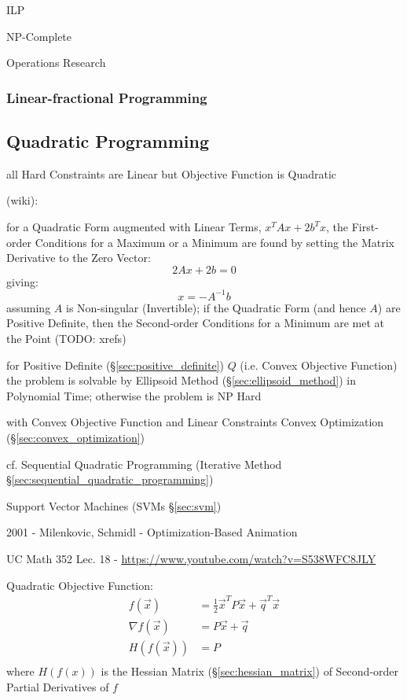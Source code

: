 ILP

NP-Complete

Operations Research



\subsubsection{Linear-fractional Programming}
\label{sec:linear_fractional_programming}



\subsection{Quadratic Programming}\label{sec:quadratic_programming}

all Hard Constraints are Linear but Objective Function is Quadratic

(wiki):

for a Quadratic Form augmented with Linear Terms, $x^TAx + 2b^Tx$, the
First-order Conditions for a Maximum or a Minimum are found by setting the
Matrix Derivative to the Zero Vector:
\[
  2Ax + 2b = 0
\]
giving:
\[
  x = -A^{-1}b
\]
assuming $A$ is Non-singular (Invertible); if the Quadratic Form (and hence
$A$) are Positive Definite, then the Second-order Conditions for a
Minimum are met at the Point
(TODO: xrefs)

for Positive Definite (\S\ref{sec:positive_definite}) $Q$ (i.e. Convex
Objective Function) the problem is solvable by Ellipsoid Method
(\S\ref{sec:ellipsoid_method}) in Polynomial Time; otherwise the problem is NP
Hard

with Convex Objective Function and Linear Constraints \fist Convex Optimization
(\S\ref{sec:convex_optimization})

\fist cf. Sequential Quadratic Programming (Iterative Method
\S\ref{sec:sequential_quadratic_programming})

\fist Support Vector Machines (SVMs \S\ref{sec:svm})

2001 - Milenkovic, Schmidl - Optimization-Based Animation

UC Math 352 Lec. 18 - \url{https://www.youtube.com/watch?v=S538WFC8JLY}

Quadratic Objective Function:
\begin{align*}
  f(\vec{x})        & = \frac{1}{2}\vec{x}^T P \vec{x} + \vec{q}^T\vec{x} \\
  \nabla f(\vec{x}) & = P\vec{x} + \vec{q} \\
  H(f(\vec{x}))     & = P \\
\end{align*}
where $H(f(x))$ is the Hessian Matrix (\S\ref{sec:hessian_matrix}) of
Second-order Partial Derivatives of $f$

